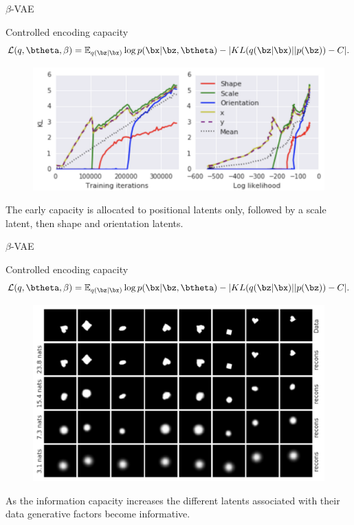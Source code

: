 \begin{frame}{$\beta$-VAE}
	\begin{block}{Controlled encoding capacity}
	\vspace{-0.5cm}
	\[
	    \mathcal{L}(q, \btheta, \beta) = \mathbb{E}_{q(\bz | \bx)} \log p(\bx | \bz, \btheta) - | KL (q(\bz | \bx) || p(\bz)) - C|.
	\]
	\end{block}
	\begin{figure}
	    \centering
	    \includegraphics[width=0.9\linewidth]{figs/betaVAE_7.png}
	\end{figure}
	The early capacity is allocated to positional latents only, followed by a scale latent, then shape and orientation latents.

\end{frame}
\begin{frame}{$\beta$-VAE}
	\begin{block}{Controlled encoding capacity}
	\vspace{-0.5cm}
	\[
	    \mathcal{L}(q, \btheta, \beta) = \mathbb{E}_{q(\bz | \bx)} \log p(\bx | \bz, \btheta) - | KL (q(\bz | \bx) || p(\bz)) - C|.
	\]
	\vspace{-0.5cm}
	\end{block}
	\begin{figure}
	    \centering
	    \includegraphics[width=0.7\linewidth]{figs/betaVAE_8.png}
	\end{figure}
	As the information capacity increases the different latents associated with their data generative factors become informative.

\end{frame}
